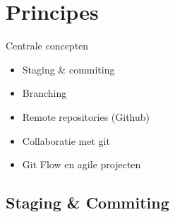 \documentclass[11pt]{beamer}
\begin{document}
\section{Principes}
\begin{frame}{Centrale concepten}
\begin{itemize}
\item Staging \& commiting
\item Branching
\item Remote repositories (Github)
\item Collaboratie met git
\item Git Flow en agile projecten
\end{itemize}
\end{frame}

\subsection{Staging \& Commiting}
\begin{frame}

\end{frame}
\end{document}
